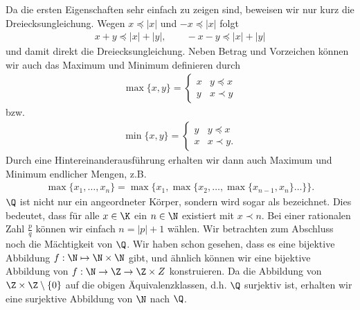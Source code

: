 \documentclass[letterpaper,10pt,english]{jupyterBook}
\begin{document}
Da die ersten Eigenschaften sehr einfach zu zeigen sind, beweisen wir nur kurz die Dreiecksungleichung. Wegen \(x \preceq |x|\) und \(-x \preceq |x|\) folgt
\begin{equation*}
\begin{split}x+y \preceq |x|+|y|, \qquad -x-y \preceq |x|+|y|\end{split}
\end{equation*}
und damit direkt die Dreiecksungleichung.
Neben Betrag und Vorzeichen können wir auch das Maximum und Minimum definieren durch
\begin{equation*}
\begin{split}\max\{x,y\} = \left\{ \begin{array}{rl} x & y \preceq x \\ y & x \prec y \end{array} \right.\end{split}
\end{equation*}
bzw.
\begin{equation*}
\begin{split}\min\{x,y\} = \left\{ \begin{array}{rl} y & y \preceq x \\ x & x \prec y. \end{array} \right.\end{split}
\end{equation*}
Durch eine Hintereinanderausführung erhalten wir dann auch Maximum und Minimum endlicher Mengen, z.B.
\begin{equation*}
\begin{split}\max\{x_1,\ldots,x_n\} = \max\{x_1,\max\{x_2, \ldots, \max\{x_{n-1},x_n\} \ldots\}\}.\end{split}
\end{equation*}
\(\Q\) ist nicht nur ein angeordneter Körper, sondern wird sogar als  bezeichnet. Dies bedeutet, dass für alle \(x \in \K\) ein \(n \in \N\) existiert mit \(x \prec n\). Bei einer rationalen Zahl \(\frac{p}q\) können wir einfach \(n = |p|+1\) wählen.
Wir betrachten zum Abschluss noch die Mächtigkeit von \(\Q\). Wir haben schon gesehen, dass es eine bijektive Abbildung \(f: \N \mapsto \N \times \N\) gibt, und ähnlich können wir eine bijektive Abbildung von \(f: \N \rightarrow \Z \rightarrow \Z \times Z\) konstruieren. Da die Abbildung von \(\Z \times \Z \setminus \{0\}\) auf die obigen Äquivalenzklassen, d.h. \(\Q\) surjektiv ist, erhalten wir eine surjektive Abbildung von \(\N\) nach \(\Q\).
\end{document}
